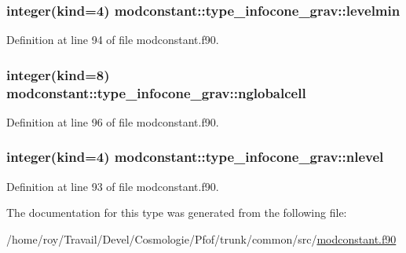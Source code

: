 \subsubsection[{\texorpdfstring{levelmin}{levelmin}}]{\setlength{\rightskip}{0pt plus 5cm}integer(kind=4) modconstant\+::type\+\_\+infocone\+\_\+grav\+::levelmin}\hypertarget{structmodconstant_1_1type__infocone__grav_a81f217da97c48e4dcc063b03cad14fb4}{}\label{structmodconstant_1_1type__infocone__grav_a81f217da97c48e4dcc063b03cad14fb4}


Definition at line 94 of file modconstant.\+f90.

\subsubsection[{\texorpdfstring{nglobalcell}{nglobalcell}}]{\setlength{\rightskip}{0pt plus 5cm}integer(kind=8) modconstant\+::type\+\_\+infocone\+\_\+grav\+::nglobalcell}\hypertarget{structmodconstant_1_1type__infocone__grav_abad2550433b2e48e7e4b82ad05021b80}{}\label{structmodconstant_1_1type__infocone__grav_abad2550433b2e48e7e4b82ad05021b80}


Definition at line 96 of file modconstant.\+f90.

\subsubsection[{\texorpdfstring{nlevel}{nlevel}}]{\setlength{\rightskip}{0pt plus 5cm}integer(kind=4) modconstant\+::type\+\_\+infocone\+\_\+grav\+::nlevel}\hypertarget{structmodconstant_1_1type__infocone__grav_a711b971de6fe902d47b0c0d562f27669}{}\label{structmodconstant_1_1type__infocone__grav_a711b971de6fe902d47b0c0d562f27669}


Definition at line 93 of file modconstant.\+f90.



The documentation for this type was generated from the following file\+:\begin{DoxyCompactItemize}
\item 
/home/roy/\+Travail/\+Devel/\+Cosmologie/\+Pfof/trunk/common/src/\hyperlink{modconstant_8f90}{modconstant.\+f90}\end{DoxyCompactItemize}
